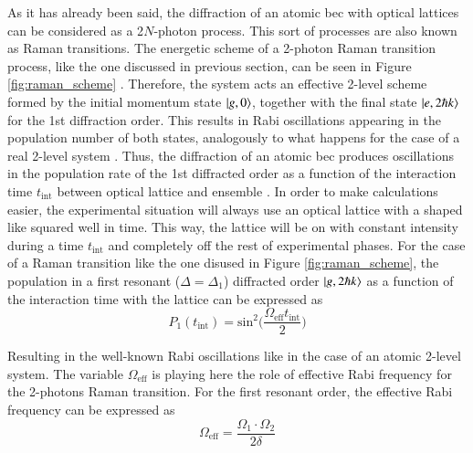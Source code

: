 As it has already been said, the diffraction of an atomic \ac{bec} with optical lattices can be considered as a 2$N$-photon process. This sort of processes are also known as Raman transitions. The energetic scheme of a 2-photon Raman transition process, like the one discussed in previous section, can be seen in Figure \ref{fig:raman_scheme} \cite{Kozuma1999}. Therefore, the system acts an effective 2-level scheme formed by the initial momentum state $\ket{g, 0}$, together with the final state $\ket{e, 2\hbar k}$ for the 1st diffraction order. This results in Rabi oscillations appearing in the population number of both states, analogously to what happens for the case of a real 2-level system \cite{Foot2005}. Thus, the diffraction of an atomic \ac{bec} produces oscillations in the population rate of the 1st diffracted order as a function of the interaction time $t_\text{int}$ between optical lattice and ensemble \cite{Martin1988}. In order to make calculations easier, the experimental situation will always use an optical lattice with a shaped like squared well in time. This way, the lattice will be on with constant intensity during a time $t_{\text{int}}$ and completely off the rest of experimental phases. For the case of a Raman transition like the one disused in Figure \ref{fig:raman_scheme}, the population in a first resonant ($\Delta=\Delta_1$) diffracted order $\ket{g, 2\hbar k}$ as a function of the interaction time with the lattice can be expressed as
\begin{equation}
	P_1(t_\text{int}) = \text{sin}^2\bigg(\frac{\Omega_\text{eff} t_\text{int}}{2}\bigg)
\end{equation}

Resulting in the well-known Rabi oscillations like in the case of an atomic 2-level system. The variable $\Omega_\text{eff}$ is playing here the role of effective Rabi frequency for the 2-photons Raman transition. For the first resonant order, the effective Rabi frequency can be expressed as
\begin{equation}
	\Omega_\text{eff} = \frac{\Omega_1 \cdot \Omega_2}{2\delta}
\end{equation}

